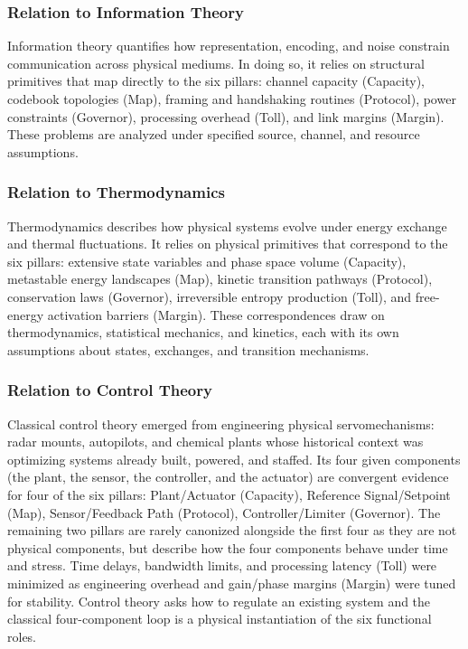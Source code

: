 \subsubsection{Relation to Information Theory}
\label{subsec:information_theory}
Information theory quantifies how representation, encoding, and noise constrain communication across physical mediums. In doing so, it relies on structural primitives that map directly to the six pillars: channel capacity (Capacity), codebook topologies (Map), framing and handshaking routines (Protocol), power constraints (Governor), processing overhead (Toll), and link margins (Margin). These problems are analyzed under specified source, channel, and resource assumptions.

\subsubsection{Relation to Thermodynamics}
\label{subsec:thermodynamics}
Thermodynamics describes how physical systems evolve under energy exchange and thermal fluctuations. It relies on physical primitives that correspond to the six pillars: extensive state variables and phase space volume (Capacity), metastable energy landscapes (Map), kinetic transition pathways (Protocol), conservation laws (Governor), irreversible entropy production (Toll), and free-energy activation barriers (Margin). These correspondences draw on thermodynamics, statistical mechanics, and kinetics, each with its own assumptions about states, exchanges, and transition mechanisms.

\subsubsection{Relation to Control Theory} 
\label{subsec:control_theory}
Classical control theory emerged from engineering physical servomechanisms: radar mounts, autopilots, and chemical plants whose historical context was optimizing systems already built, powered, and staffed. Its four given components (the plant, the sensor, the controller, and the actuator) are convergent evidence for four of the six pillars: Plant/Actuator (Capacity), Reference Signal/Setpoint (Map), Sensor/Feedback Path (Protocol), Controller/Limiter (Governor). The remaining two pillars are rarely canonized alongside the first four as they are not physical components, but describe how the four components behave under time and stress. Time delays, bandwidth limits, and processing latency (Toll) were minimized as engineering overhead and gain/phase margins (Margin) were tuned for stability. Control theory asks how to regulate an existing system and the classical four-component loop is a physical instantiation of the six functional roles.
